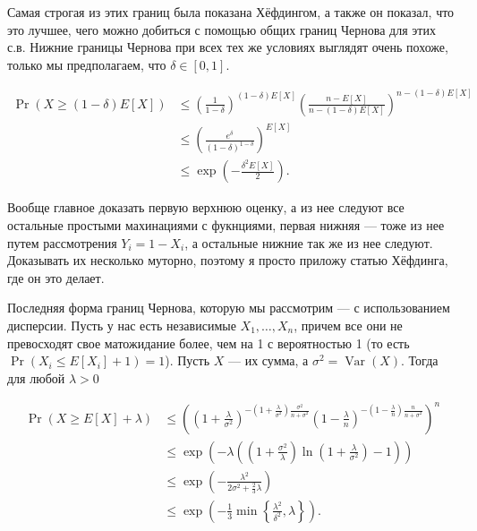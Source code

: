 \documentclass[12pt]{article}
\DeclareMathOperator{\Var}{Var}
\begin{document}
Самая строгая из этих границ была показана Хёфдингом, а также он показал, что это лучшее, чего можно добиться с помощью общих границ Чернова для этих с.в. Нижние границы Чернова при всех тех же условиях выглядят очень похоже, только мы предполагаем, что $\delta \in [0, 1]$.

\begin{align*}
  \Pr(X \ge (1 - \delta)E[X]) &\le \left(\frac{1}{1 - \delta}\right)^{(1 - \delta)E[X]} \left(\frac{n - E[X]}{n - (1 - \delta)E[X]}\right)^{n - (1 - \delta)E[X]} \\
  &\le \left(\frac{e^\delta}{(1 - \delta)^{1 - \delta}}\right)^{E[X]} \\
  &\le \exp\left(-\frac{\delta^2E[X]}{2}\right).
\end{align*}

Вообще главное доказать первую верхнюю оценку, а из нее следуют все остальные простыми махинациями с фукнциями, первая нижняя --- тоже из нее путем рассмотрения $Y_i = 1 - X_i$, а остальные нижние так же из нее следуют. Доказывать их несколько муторно, поэтому я просто приложу статью Хёфдинга, где он это делает.

Последняя форма границ Чернова, которую мы рассмотрим --- с использованием дисперсии. Пусть у нас есть независимые $X_1, \dots, X_n$, причем все они не превосходят свое матожидание более, чем на 1 с вероятностью 1 (то есть $\Pr(X_i \le E[X_i] + 1) = 1$). Пусть $X$ --- их сумма, а $\sigma^2 = \Var(X)$. Тогда для любой $\lambda > 0$

\begin{align*}
  \Pr(X \ge E[X] + \lambda) &\le \left(\left(1 + \frac{\lambda}{\sigma^2}\right)^{-(1 + \frac{\lambda}{\sigma^2})\frac{\sigma^2}{n + \sigma^2}} \left(1 - \frac{\lambda}{n}\right)^{-(1 - \frac{\lambda}{n})\frac{n}{n + \sigma^2}} \right)^n \\
  &\le \exp\left(-\lambda\left(\left(1 + \frac{\sigma^2}{\lambda}\right)\ln\left(1 + \frac{\lambda}{\sigma^2}\right) - 1\right)\right) \\
  &\le \exp\left(-\frac{\lambda^2}{2\sigma^2 + \frac{2}{3}\lambda}\right) \\
  &\le \exp\left(-\frac{1}{3} \min\left\{ \frac{\lambda^2}{\delta^2}, \lambda\right\}\right).
\end{align*}
\end{document}
